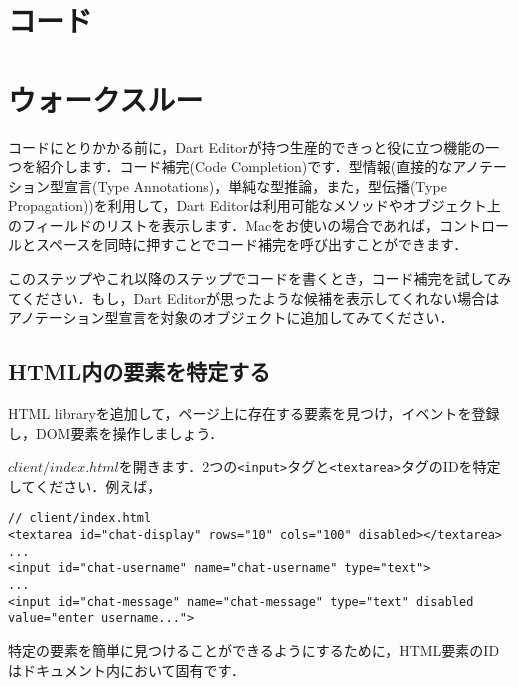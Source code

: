 \section{コード}


\section{ウォークスルー}

コードにとりかかる前に，Dart Editorが持つ生産的できっと役に立つ機能の一つを紹介します．コード補完(Code Completion)です．型情報(直接的なアノテーション型宣言(Type Annotations)，単純な型推論，また，型伝播(Type Propagation))を利用して，Dart Editorは利用可能なメソッドやオブジェクト上のフィールドのリストを表示します．Macをお使いの場合であれば，コントロールとスペースを同時に押すことでコード補完を呼び出すことができます．


このステップやこれ以降のステップでコードを書くとき，コード補完を試してみてください．もし，Dart Editorが思ったような候補を表示してくれない場合はアノテーション型宣言を対象のオブジェクトに追加してみてください．


\subsection{HTML内の要素を特定する}

HTML libraryを追加して，ページ上に存在する要素を見つけ，イベントを登録し，DOM要素を操作しましょう．

$ client/index.html $を開きます．2つの\verb|<input>|タグと\verb|<textarea>|タグのIDを特定してください．例えば，

\begin{verbatim}
// client/index.html
<textarea id="chat-display" rows="10" cols="100" disabled></textarea>
...
<input id="chat-username" name="chat-username" type="text">
...
<input id="chat-message" name="chat-message" type="text" disabled
value="enter username...">
\end{verbatim}

特定の要素を簡単に見つけることができるようにするために，HTML要素のIDはドキュメント内において固有です．

